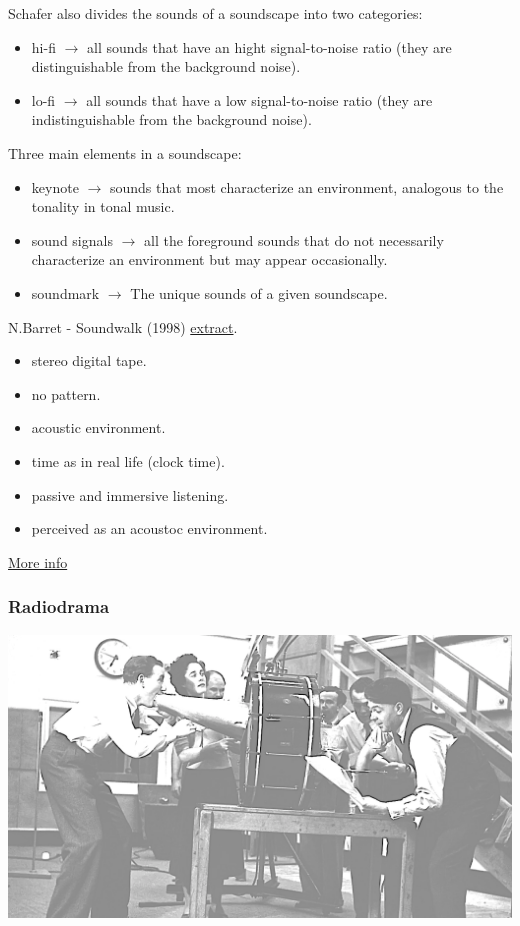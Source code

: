 Schafer also divides the sounds of a soundscape into two categories:

\begin{itemize}
\tightlist
\item hi-fi \(\rightarrow\) all sounds that have an hight signal-to-noise ratio (they are distinguishable from the background noise).
\item lo-fi \(\rightarrow\) all sounds that have a low signal-to-noise ratio (they are indistinguishable from the background noise).
\end{itemize}

Three main elements in a soundscape:

\begin{itemize}
\tightlist
\item keynote \(\rightarrow\) sounds that most characterize an environment, analogous to the tonality in tonal music.
\item sound signals \(\rightarrow\) all the foreground sounds that do not necessarily characterize an environment but may appear occasionally.
\item soundmark \(\rightarrow\) The unique sounds of a given soundscape.
\end{itemize}

N.Barret - Soundwalk (1998) \href{suoni/soundwalk.mp3}{extract}.

\begin{itemize}
\tightlist
\item stereo digital tape. 
\item no pattern. 
\item acoustic environment. 
\item time as in real life (clock time). 
\item passive and immersive listening. 
\item perceived as an acoustoc environment.
\end{itemize}

\href{img/schafer.pdf}{More info}

\subsubsection{Radiodrama }\label{radiodrama}

\begin{center}
\includegraphics[scale=0.5]{../img/radiodrama.png}
\end{center}

